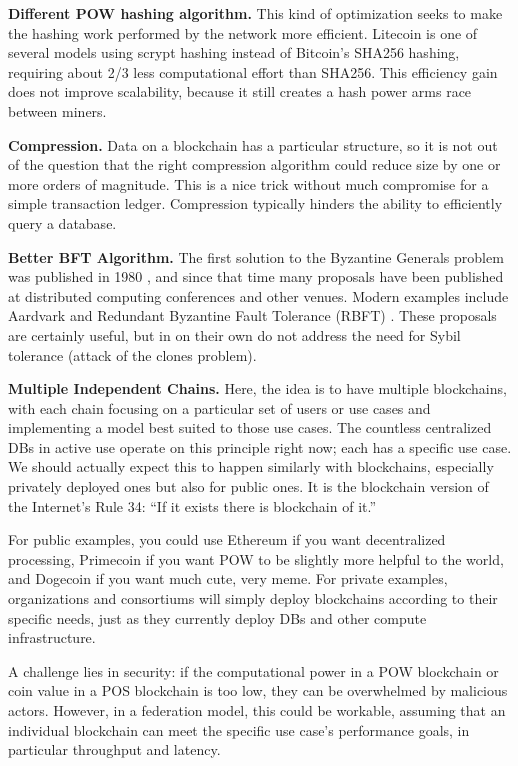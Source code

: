 \medskip
\noindent\textbf{Different POW hashing algorithm.} This kind of optimization seeks to make the hashing work performed by the network more efficient. 
Litecoin is one of several models using scrypt hashing instead of Bitcoin’s SHA256 hashing, requiring about 2/3 less computational effort than SHA256. 
This efficiency gain does not improve scalability, because it still creates a hash power arms race between miners.

\medskip
\noindent\textbf{Compression.} Data on a blockchain has a particular structure, so it is not out of the question that the right compression algorithm could reduce size by one or more orders of magnitude. 
This is a nice trick without much compromise for a simple transaction ledger. 
Compression typically hinders the ability to efficiently query a database.

\medskip
\noindent\textbf{Better BFT Algorithm.} The first solution to the Byzantine Generals problem was published in 1980 \cite{pease1980reaching}, and since that time many proposals have been published at distributed computing conferences and other venues. 
Modern examples include Aardvark \cite{clement2009making} and Redundant Byzantine Fault Tolerance (RBFT) \cite{aublin2013rbft}. 
These proposals are certainly useful, but in on their own do not address the need for Sybil tolerance (attack of the clones problem).

\medskip
\noindent\textbf{Multiple Independent Chains.} Here, the idea is to have multiple blockchains, with each chain focusing on a particular set of users or use cases and implementing a model best suited to those use cases. 
The countless centralized DBs in active use operate on this principle right now; each has a specific use case. 
We should actually expect this to happen similarly with blockchains, especially privately deployed ones but also for public ones. 
It is the blockchain version of the Internet’s Rule 34: “If it exists there is blockchain of it.”

For public examples, you could use Ethereum if you want decentralized processing, Primecoin if you want POW to be slightly more helpful to the world, and Dogecoin if you want much cute, very meme. 
For private examples, organizations and consortiums will simply deploy blockchains according to their specific needs, just as they currently deploy DBs and other compute infrastructure.

A challenge lies in security: if the computational power in a POW blockchain or coin value in a POS blockchain is too low, they can be overwhelmed by malicious actors. 
However, in a federation model, this could be workable, assuming that an individual blockchain can meet the specific use case’s performance goals, in particular throughput and latency.

